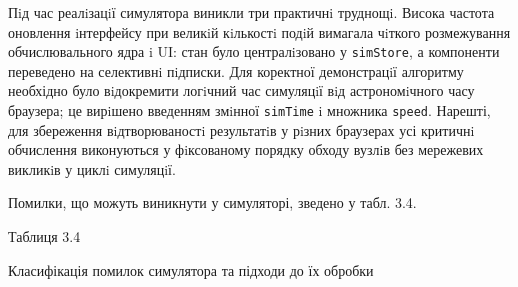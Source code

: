 \documentclass[
]{article}
\newcommand{\passthrough}[1]{#1}
\begin{document}
Пiд час реалiзацiї симулятора виникли три практичнi труднощi. Висока
частота оновлення iнтерфейсу при великiй кiлькостi подiй вимагала
чiткого розмежування обчислювального ядра i UI: стан було централiзовано
у \passthrough{\lstinline!simStore!}, а компоненти переведено на
селективнi пiдписки. Для коректної демонстрацiї алгоритму необхідно було
вiдокремити логiчний час симуляцiї вiд астрономiчного часу браузера; це
вирiшено введенням змiнної \passthrough{\lstinline!simTime!} i множника
\passthrough{\lstinline!speed!}. Нарешті, для збереження вiдтворюваностi
результатiв у рiзних браузерах усі критичнi обчислення виконуються у
фiксованому порядку обходу вузлiв без мережевих викликiв у циклi
симуляцiї.

Помилки, що можуть виникнути у симуляторі, зведено у табл. 3.4.

Таблиця 3.4

Класифікація помилок симулятора та підходи до їх обробки
\end{document}

